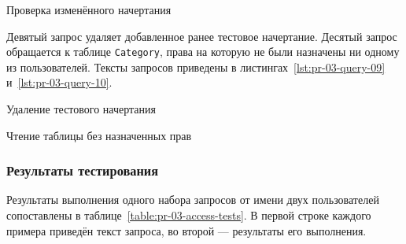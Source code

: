 {Проверка изменённого начертания}
{\label{lst:pr-03-query-08}}

Девятый запрос удаляет добавленное ранее тестовое начертание. Десятый запрос
обращается к таблице \texttt{Category}, права на которую не были
назначены ни одному из пользователей. Тексты запросов приведены в
листингах~\ref{lst:pr-03-query-09} и~\ref{lst:pr-03-query-10}.

{Удаление тестового начертания}
{\label{lst:pr-03-query-09}}

{Чтение таблицы без назначенных прав}
{\label{lst:pr-03-query-10}}

\subsubsection{Результаты тестирования}

Результаты выполнения одного набора запросов от имени двух пользователей
сопоставлены в таблице~\ref{table:pr-03-access-tests}. В первой строке каждого
примера приведён текст запроса, во второй --- результаты его выполнения.


